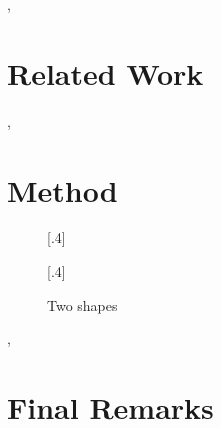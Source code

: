 \documentclass[manuscript,screen,nonacm]{acmart}
\begin{document}
\lipsum[1]\cite{TeXFAQ}, \cite{Downes04:amsart}

\section{Related Work}
\label{sec:related}

\lipsum[1]\cite{Fiorio15}, \cite{Brito09}

\section{Method}
\label{sec:method}

\begin{figure}[!ht]
    \centering
    [.4\textwidth]{
    }
    [.4\textwidth]{
    }
    \caption{Two shapes}\label{fig:shapes}
    \Description{}
\end{figure}

\lipsum[1]\cite{Heinz15}, \cite{Fear05}

\section{Final Remarks}
\label{sec:remarks}

\lipsum[1]\cite{Carlisle04:Textcase,Braams22:Babel}



\end{document}
